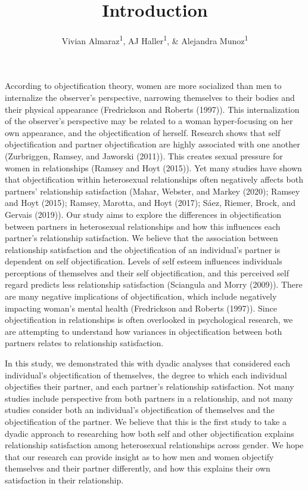 \documentclass[
  english,
  man]{apa6}
\title{Introduction}
\author{Vivian Almaraz\textsuperscript{1}, AJ Haller\textsuperscript{1}, \& Alejandra Munoz\textsuperscript{1}}
\date{}
\affiliation{\vspace{0.5cm}\textsuperscript{1} Smith College}
\begin{document}
\maketitle

According to objectification theory, women are more socialized than men to internalize the observer's perspective, narrowing themselves to their bodies and their physical appearance (Fredrickson and Roberts (1997)). This internalization of the observer's perspective may be related to a woman hyper-focusing on her own appearance, and the objectification of herself. Research shows that self objectification and partner objectification are highly associated with one another (Zurbriggen, Ramsey, and Jaworski (2011)). This creates sexual pressure for women in relationships (Ramsey and Hoyt (2015)). Yet many studies have shown that objectification within heterosexual relationships often negatively affects both partners' relationship satisfaction (Mahar, Webster, and Markey (2020); Ramsey and Hoyt (2015); Ramsey, Marotta, and Hoyt (2017); Sáez, Riemer, Brock, and Gervais (2019)). Our study aims to explore the differences in objectification between partners in heterosexual relationships and how this influences each partner's relationship satisfaction.
We believe that the association between relationship satisfaction and the objectification of an individual's partner is dependent on self objectification. Levels of self esteem influences individuals perceptions of themselves and their self objectification, and this perceived self regard predicts less relationship satisfaction (Sciangula and Morry (2009)). There are many negative implications of objectification, which include negatively impacting woman's mental health (Fredrickson and Roberts (1997)). Since objectification in relationships is often overlooked in psychological research, we are attempting to understand how variances in objectification between both partners relates to relationship satisfaction.

In this study, we demonstrated this with dyadic analyses that considered each individual's objectification of themselves, the degree to which each individual objectifies their partner, and each partner's relationship satisfaction. Not many studies include perspective from both partners in a relationship, and not many studies consider both an individual's objectification of themselves and the objectification of the partner. We believe that this is the first study to take a dyadic approach to researching how both self and other objectification explains relationship satisfaction among heterosexual relationships across gender. We hope that our research can provide insight as to how men and women objectify themselves and their partner differently, and how this explains their own satisfaction in their relationship.
\end{document}
